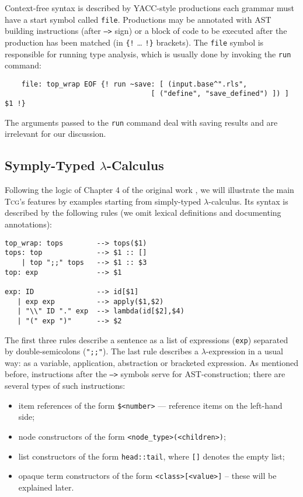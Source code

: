 \documentclass[a4paper,12pt]{article}
\newcommand{\Tcg}{\textsc{Tcg}}
\newcommand{\code}[1]{\texttt{#1}}
\begin{document}
Context-free syntax is described by YACC-style productions each grammar must have a start symbol called \code{file}. Productions may be annotated with AST building instructions (after \code{-->} sign) or a block of code to be executed after the production has been matched (in \code{\{!} \ldots{} \code{!\}} brackets). The \code{file} symbol is responsible for running type analysis, which is usually done by invoking the \code{run} command:

\begin{verbatim}
	file: top_wrap EOF {! run ~save: [ (input.base^".rls",
	                               [ ("define", "save_defined") ]) ] $1 !}
\end{verbatim}

The arguments passed to the \code{run} command deal with saving results and are irrelevant for our discussion.

\subsection{Symply-Typed $\lambda$-Calculus}

Following the logic of Chapter 4 of the original work \cite{Gast04}, we will illustrate the main \Tcg{}'s features by examples starting from simply-typed $\lambda$-calculus. Its syntax is described by the following rules (we omit lexical definitions and documenting annotations):

\begin{verbatim}
top_wrap: tops        --> tops($1)
tops: top             --> $1 :: []
    | top ";;" tops   --> $1 :: $3
top: exp              --> $1

exp: ID               --> id[$1]
   | exp exp          --> apply($1,$2)
   | "\\" ID "." exp  --> lambda(id[$2],$4)
   | "(" exp ")"      --> $2
\end{verbatim}

The first three rules describe a sentence as a list of expressions (\code{exp}) separated by double-semicolons (\code{";;"}). The last rule describes a $\lambda$-expression in a usual way: as a variable, application, abstraction or bracketed expression. As mentioned before, instructions after the \code{-->} symbols serve for AST-construction; there are several types of such instructions:
\begin{itemize}
 \item item references of the form \code{\$<number>} --- reference items on the left-hand side;
 \item node constructors of the form \code{<node_type>(<children>)};
 \item list constructors of the form \code{head::tail}, where \code{[]} denotes the empty list;
 \item opaque term constructors of the form \code{<class>[<value>]} -- these will be explained later.
\end{itemize}
\end{document}
